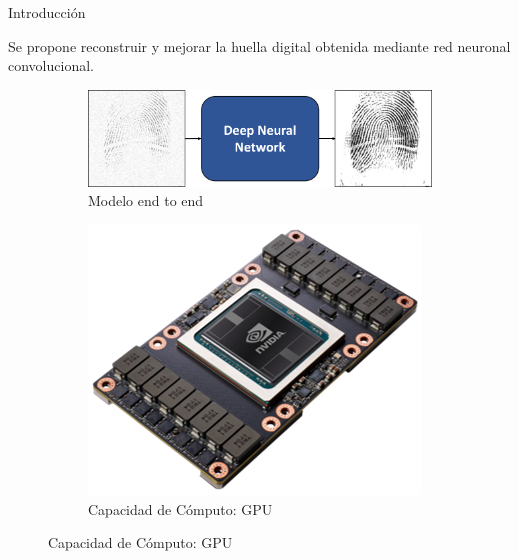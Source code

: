 \documentclass[12pt,aspectratio=169]{beamer}
\begin{document}
\begin{frame}{Introducción}

    Se propone reconstruir y mejorar la huella digital obtenida mediante red neuronal convolucional.
    \vspace{3mm}

    \begin{figure}[h]
        \begin{subfigure}{0.58\textwidth}
            \centering
            \includegraphics[scale=0.34]{figs/end_to_end.png}  
            \caption{Modelo end to end}
        \end{subfigure}
        \begin{subfigure}{0.38\textwidth}
            \centering
            \includegraphics[scale=0.28]{figs/nvidia_card.png}  
            \caption{Capacidad de Cómputo: GPU}
        \end{subfigure}
    \end{figure}

\end{frame}
\end{document}
